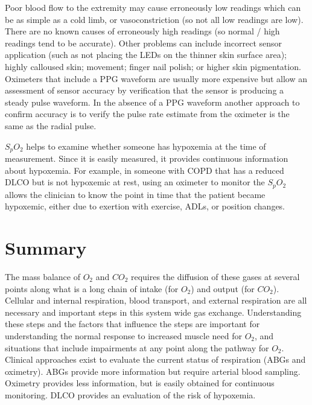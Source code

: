 Poor blood flow to the extremity may cause erroneously low readings which can be as simple as a cold limb, or vasoconstriction (so not all low readings are low). There are no known causes of erroneously high readings (so normal / high readings tend to be accurate).\footnotemark{} Other problems can include incorrect sensor application (such as not placing the LEDs on the thinner skin surface area); highly calloused skin; movement; finger nail polish; or higher skin pigmentation. Oximeters that include a PPG waveform are usually more expensive but allow an assessment of sensor accuracy by verification that the sensor is producing a steady pulse waveform. In the absence of a PPG waveform another approach to confirm accuracy is to verify the pulse rate estimate from the oximeter is the same as the radial pulse.

$S_pO_2$ helps to examine whether someone has hypoxemia at the time of measurement. Since it is easily measured, it provides continuous information about hypoxemia. For example, in someone with COPD that has a reduced DLCO but is not hypoxemic at rest, using an oximeter to monitor the $S_pO_2$ allows the clinician to know the point in time that the patient became hypoxemic, either due to exertion with exercise, ADLs, or position changes.

\section{Summary}

The mass balance of $O_2$ and $CO_2$ requires the diffusion of these gases at several points along what is a long chain of intake (for $O_2$) and output (for $CO_2$). Cellular and internal respiration, blood transport, and external respiration are all necessary and important steps in this system wide gas exchange. Understanding these steps and the factors that influence the steps are important for understanding the normal response to increased muscle need for $O_2$, and situations that include impairments at any point along the pathway for $O_2$. Clinical approaches exist to evaluate the current status of respiration (ABGs and oximetry). ABGs provide more information but require arterial blood sampling. Oximetry provides less information, but is easily obtained for continuous monitoring. DLCO provides an evaluation of the risk of hypoxemia. 


